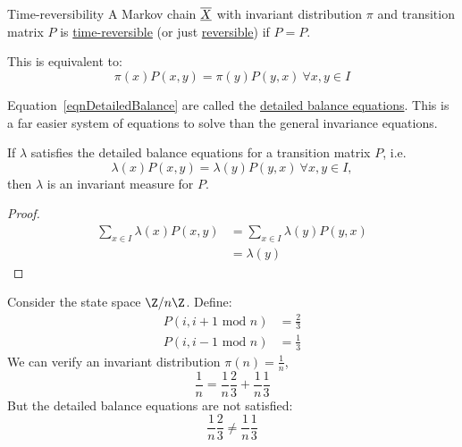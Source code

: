 \documentclass[../Main.tex]{subfiles}
\begin{document}
\begin{definition}{Time-reversibility}
    A Markov chain $\underline{\overline{X}}$ with invariant distribution $\pi$ and transition matrix $P$ is \underline{time-reversible} (or just \underline{reversible}) if $\hat{P} = P$.

    This is equivalent to:
    \begin{equation}
        \pi(x) P(x, y) = \pi(y) P(y, x)~\forall x, y \in I
        \label{eqnDetailedBalance}
    \end{equation}
\end{definition}
Equation~\ref{eqnDetailedBalance} are called the \underline{detailed balance equations}. This is a far easier system of equations to solve than the general invariance equations.
\begin{lemma}
    If $\lambda$ satisfies the detailed balance equations for a transition matrix $P$, i.e.
    \begin{equation*}
        \lambda(x) P(x, y) = \lambda(y) P(y, x)~\forall x, y \in I,
    \end{equation*}
    then $\lambda$ is an invariant measure for $P$.
    \label{eqnDBImpliesInvariant}
\end{lemma}
\begin{proof}
    \begin{align*}
        \sum_{x \in I} \lambda(x) P(x, y) &= \sum_{x \in I} \lambda(y) P(y, x) \\
        &= \lambda(y)
    \end{align*}
\end{proof}
\begin{example}
    Consider the state space $\Z / n \Z$. Define:
    \begin{align*}
        P(i, i+1 \text{ mod } n) &= \frac23 \\
        P(i, i-1 \text{ mod } n) &= \frac13
    \end{align*}
    We can verify an invariant distribution $\pi(n) = \frac1n$,
    \begin{equation*}
        \frac1n = \frac1n\frac23 + \frac1n \frac13
    \end{equation*}
    But the detailed balance equations are not satisfied:
    \begin{equation*}
        \frac1n \frac23 \neq \frac1n \frac13
    \end{equation*}
\end{example}
\end{document}
